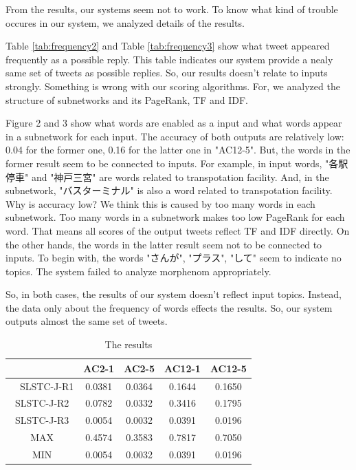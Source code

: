 \documentclass{../style/sig-alternate}
\begin{document}
From the results, our systems seem not to work. To know what kind of trouble occures in our system, we analyzed details of the results.


Table \ref{tab:frequency2} and Table \ref{tab:frequency3} show what tweet appeared frequently as a possible reply. This table indicates our system provide a nealy same set of tweets as possible replies. So, our results doesn't relate to inputs strongly. Something is wrong with our scoring algorithms. For, we analyzed the structure of subnetworks and its PageRank, TF and IDF.


Figure 2 and 3 show what words are enabled as a input and what words appear in a subnetwork for each input.
The accuracy of both outputs are relatively low: 0.04 for the former one, 0.16 for the latter one in "AC12-5". But, the words in the former result seem to be connected to inputs. For example, in input words, \mbox{"各駅停車"} and \mbox{"神戸三宮"} are words related to transpotation facility. And, in the subnetwork, \mbox{"バスターミナル"} is also a word related to transpotation facility. Why is accuracy low? We think this is caused by too many words in each subnetwork. Too many words in a subnetwork makes too low PageRank for each word. That means all scores of the output tweets reflect TF and IDF directly.
On the other hands, the words in the latter result seem not to be connected to inputs. To begin with, the words \mbox{"さんが"}, \mbox{"プラス"}, \mbox{"して"} seem to indicate no topics. The system failed to analyze morphenom appropriately.


So, in both cases, the results of our system doesn't reflect input topics. Instead, the data only about the frequency of words effects the results. So, our system outputs almost the same set of tweets.

\begin{table}[h!]
  \centering
  \caption{The results}
  \label{tab:results}
  \begin{tabular}{|c|c|c|c|c|} \hline
    　 & AC2-1 & AC2-5 & AC12-1 & AC12-5 \\ \hline
    　SLSTC-J-R1 & 0.0381 & 0.0364 & 0.1644 & 0.1650 \\ \hline
      SLSTC-J-R2 & 0.0782 & 0.0332 & 0.3416 & 0.1795\\ \hline
      SLSTC-J-R3 & 0.0054 & 0.0032 & 0.0391 & 0.0196\\ \hline
      MAX & 0.4574 & 0.3583 & 0.7817 & 0.7050\\ \hline
      MIN & 0.0054 & 0.0032 & 0.0391 & 0.0196\\ \hline
  \end{tabular}
\end{table}
\end{document}
